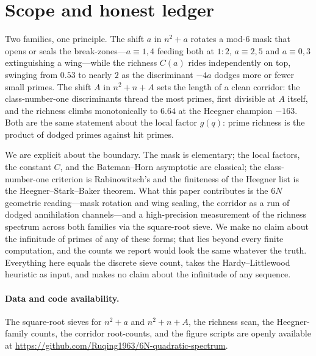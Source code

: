 \documentclass[11pt]{article}
\theoremstyle{definition}
\begin{document}
\FloatBarrier
\section{Scope and honest ledger}
Two families, one principle. The shift $a$ in $n^2+a$ rotates a mod-$6$ mask that opens or seals the
break-zones---$a\equiv1,4$ feeding both at $1{:}2$, $a\equiv2,5$ and $a\equiv0,3$ extinguishing a
wing---while the richness $C(a)$ rides independently on top, swinging from $0.53$ to nearly $2$ as the
discriminant $-4a$ dodges more or fewer small primes. The shift $A$ in $n^2+n+A$ sets the length of a
clean corridor: the class-number-one discriminants thread the most primes, first divisible at $A$
itself, and the richness climbs monotonically to $6.64$ at the Heegner champion $-163$. Both are the
same statement about the local factor $g(q)$: prime richness is the product of dodged primes against
hit primes.

We are explicit about the boundary. The mask is elementary; the local factors, the constant $C$, and
the Bateman--Horn asymptotic are classical; the class-number-one criterion is Rabinowitsch's and the
finiteness of the Heegner list is the Heegner--Stark--Baker theorem. What this paper contributes is the
$6N$ geometric reading---mask rotation and wing sealing, the corridor as a run of dodged annihilation
channels---and a high-precision measurement of the richness spectrum across both families via the
square-root sieve. We make no claim about the infinitude of primes of any of these forms; that lies
beyond every finite computation, and the counts we report would look the same whatever the truth.
Everything here equals the discrete sieve count, takes the Hardy--Littlewood heuristic as input, and
makes no claim about the infinitude of any sequence.

\paragraph{Data and code availability.} The square-root sieves for $n^2+a$ and $n^2+n+A$, the richness
scan, the Heegner-family counts, the corridor root-counts, and the figure scripts are openly available
at \url{https://github.com/Ruqing1963/6N-quadratic-spectrum}.
\end{document}
